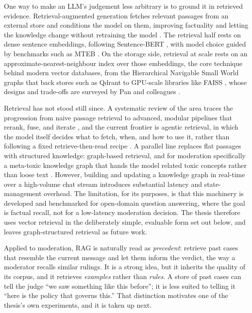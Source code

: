 One way to make an LLM's judgement less arbitrary is to ground it in retrieved evidence. Retrieval-augmented generation fetches relevant passages from an external store and conditions the model on them, improving factuality and letting the knowledge change without retraining the model \citep{rag2020}. The retrieval half rests on dense sentence embeddings, following Sentence-BERT \citep{sbert2019}, with model choice guided by benchmarks such as MTEB \citep{mteb2023}. On the storage side, retrieval at scale rests on an approximate-nearest-neighbour index over those embeddings, the core technique behind modern vector databases, from the Hierarchical Navigable Small World graphs that back stores such as Qdrant \citep{hnsw2020} to GPU-scale libraries like FAISS \citep{faiss2021}, whose designs and trade-offs are surveyed by Pan and colleagues \citep{vecdbsurvey2024}.

Retrieval has not stood still since. A systematic review of the area traces the progression from naive passage retrieval to advanced, modular pipelines that rerank, fuse, and iterate \citep{ragreview2025}, and the current frontier is agentic retrieval, in which the model itself decides what to fetch, when, and how to use it, rather than following a fixed retrieve-then-read recipe \citep{agenticragsurvey2025}. A parallel line replaces flat passages with structured knowledge: graph-based retrieval, and for moderation specifically a meta-toxic knowledge graph that hands the model related toxic concepts rather than loose text \citep{metatoxicKG2024}. However, building and updating a knowledge graph in real-time over a high-volume chat stream introduces substantial latency and state-management overhead. The limitation, for its purposes, is that this machinery is developed and benchmarked for open-domain question answering, where the goal is factual recall, not for a low-latency moderation decision. The thesis therefore uses vector retrieval in the deliberately simple, evaluable form set out below, and leaves graph-structured retrieval as future work.

Applied to moderation, RAG is naturally read as \emph{precedent}: retrieve past cases that resemble the current message and let them inform the verdict, the way a moderator recalls similar rulings. It is a strong idea, but it inherits the quality of its corpus, and it retrieves \emph{examples} rather than \emph{rules}. A store of past cases can tell the judge ``we saw something like this before''; it is less suited to telling it ``here is the policy that governs this.'' That distinction motivates one of the thesis's own experiments, and it is taken up next.

